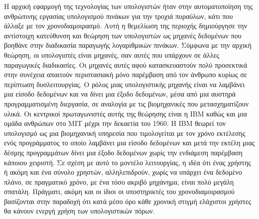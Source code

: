 \documentclass[
]{article}
\begin{document}
Η αρχική εφαρμογή της τεχνολογίας των υπολογιστών ήταν στην
αυτοματοποίηση της ανθρώπινης εργασίας υπολογισμού πινάκων για την
τροχιά πυραύλων, κάτι που άλλαξε με τον χρονοδιαμοιρασμό. Αυτή η
θεμελίωση της περιοχής δημιούργησε την αντίστοιχη κατεύθυνση και θεώρηση
των υπολογιστών ως μηχανές δεδομένων που βοηθάνε στην διαδικασία
παραγωγής λογαριθμικών πινάκων. Σύμφωνα με την αρχική θεώρηση, οι
υπολογιστές είναι μηχανές, σαν αυτές που υπάρχουν σε άλλες παραγωγικές
διαδικασίες. Οι μηχανές αυτές αφού κατασκευαστούν πολύ προσεκτικά στην
συνέχεια απαιτούν περιστασιακή μόνο παρέμβαση από τον άνθρωπο κυρίως σε
περίπτωση δυσλειτουργίας. Ο ρόλος μιας υπολογιστικής μηχανής είναι να
λαμβάνει μια είσοδο δεδομένων και να δίνει μια έξοδο δεδομένων, μέσα από
μια αυστηρά προγραμματισμένη διεργασία, σε αναλογία με τις βιομηχανικές
που μετασχηματίζουν υλικά. Οι κεντρικοί πρωταγωνιστές αυτής της θεώρησης
είναι η IBM καθώς και μια ομάδα ανθρώπων στο MIT μέχρι την δεκαετία του
1960. Η IBM θεωρεί τον υπολογισμό ως μια βιομηχανική υπηρεσία που
τιμολογείται με τον χρόνο εκτέλεσης ενός προγράμματος το οποίο λαμβάνει
μια είσοδο δεδομένων και μετά την εκτέλη μιας δέσμης προγραμμάτων δίνει
μια έξοδο δεδομένων χωρίς την ενδιάμεση παρέμβαση κάποιου χειριστή. Σε
σχέση με αυτό το μοντέλο λειτουργίας, η ιδέα ότι ένας χρήστης ή ακόμη
και ένα σύνολο χρηστών, αλληλεπιδρούν, χωρίς να υπάρχει ένα δεδομένο
πλάνο, σε πραγματικό χρόνο, με ένα τόσο ακριβό μηχάνημα, είναι πολύ
μεγάλη σπατάλη. Πράγματι, ακόμη και οι ίδιοι οι υποστηρικτές του
χρονοδιαμοιρασμού βασίζονται στην παραδοχή ότι κατά μέσο όρο κάθε
χρονική στιγμή ελάχιστοι χρήστες θα κάνουν ενεργή χρήση των
υπολογιστικών πόρων.
\end{document}
